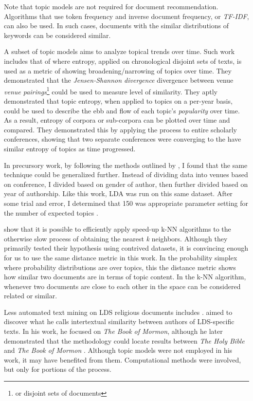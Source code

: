 Note that topic models are not required for document recommendation. Algorithms that use token frequency and inverse document frequency, or \emph{TF-IDF}, can also be used. In such cases, documents with the similar distributions of keywords can be considered similar.

A subset of topic models aims to analyze topical trends over time. Such work includes that of \cite{hall-jurafsky-manning:2008:EMNLP} where entropy, applied on chronological disjoint sets of texts, is used as a metric of showing broadening/narrowing of topics over time. They demonstrated that the \emph{Jensen-Shannon divergence} divergence between venue \emph{venue pairings}\footnote{or disjoint sets of documents} could be used to measure level of similarity. They aptly demonstrated that topic entropy, when applied to topics on a per-year basis, could be used to describe the ebb and flow of each topic’s \emph{popularity} over time. As a result, entropy of corpora or sub-corpora can be plotted over time and compared. They demonstrated this by applying the process to entire scholarly conferences, showing that two separate conferences were converging to the have similar entropy of topics as time progressed.

In precursory work, by following the methods outlined by \cite{hall-jurafsky-manning:2008:EMNLP}, I found that the same technique could be generalized further. Instead of dividing data into venues based on conference, I divided based on gender of author, then further divided based on year of authorship. Like this work, LDA was run on this same dataset. After some trial and error, I determined that 150 was appropriate parameter setting for the number of expected topics \citep{bean5-LDA-ToT}.%

\cite{Krstovski2013efficient} %
show that it is possible to efficiently apply speed-up k-NN algorithms to the otherwise slow process of obtaining the nearest \emph{k} neighbors. Although they primarily tested their hypothesis using contrived datasets, it is convincing enough for us to use the same distance metric in this work. In the probability simplex where probability distributions are over topics, this the distance metric shows how similar two documents are in terms of topic content. In the k-NN algorithm, whenever two documents are close to each other in the space can be considered related or similar.

Less automated text mining on LDS religious documents includes \citep{hilton:2008:abinadi} %
. \citeauthor{hilton:2008:abinadi} aimed to discover what he calls intertextual similarity between authors of LDS-specific texts. In his work, he focused on \emph{The Book of Mormon}, although he later demonstrated that the methodology could locate results between \emph{The Holy Bible} and \emph{The Book of Mormon} \citep{hilton:2013:psalms}. Although topic models were not employed in his work, it may have benefited from them. Computational methods were involved, but only for portions of the process.

